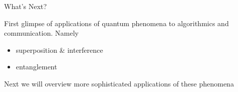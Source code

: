 \documentclass{beamer}
\begin{document}
\begin{frame}{What's Next?}

        First glimpse of applications of quantum phenomena to algorithmics
        and communication. Namely
        \begin{itemize}
                \item superposition \& interference
                \item entanglement
        \end{itemize}

        Next we will overview more sophisticated applications of these
        phenomena
\end{frame}
\end{document}
